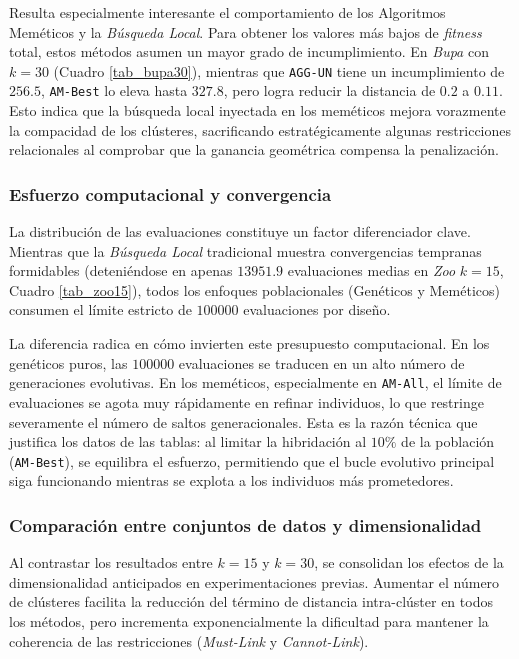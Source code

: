 \documentclass[a4paper,12pt]{article}%
\begin{document}
Resulta especialmente interesante el comportamiento de los Algoritmos Meméticos y la \textit{Búsqueda Local}. Para obtener los valores más bajos de \textit{fitness} total, estos métodos asumen un mayor grado de incumplimiento. En \textit{Bupa} con $k=30$ (Cuadro \ref{tab_bupa30}), mientras que \texttt{AGG-UN} tiene un incumplimiento de $256.5$, \texttt{AM-Best} lo eleva hasta $327.8$, pero logra reducir la distancia de $0.2$ a $0.11$. Esto indica que la búsqueda local inyectada en los meméticos mejora vorazmente la compacidad de los clústeres, sacrificando estratégicamente algunas restricciones relacionales al comprobar que la ganancia geométrica compensa la penalización.

\subsubsection{Esfuerzo computacional y convergencia}

\noindent La distribución de las evaluaciones constituye un factor diferenciador clave. Mientras que la \textit{Búsqueda Local} tradicional muestra convergencias tempranas formidables (deteniéndose en apenas $13951.9$ evaluaciones medias en \textit{Zoo} $k=15$, Cuadro \ref{tab_zoo15}), todos los enfoques poblacionales (Genéticos y Meméticos) consumen el límite estricto de $100000$ evaluaciones por diseño.

La diferencia radica en cómo invierten este presupuesto computacional. En los genéticos puros, las $100000$ evaluaciones se traducen en un alto número de generaciones evolutivas. En los meméticos, especialmente en \texttt{AM-All}, el límite de evaluaciones se agota muy rápidamente en refinar individuos, lo que restringe severamente el número de saltos generacionales. Esta es la razón técnica que justifica los datos de las tablas: al limitar la hibridación al $10\%$ de la población (\texttt{AM-Best}), se equilibra el esfuerzo, permitiendo que el bucle evolutivo principal siga funcionando mientras se explota a los individuos más prometedores.

\subsubsection{Comparación entre conjuntos de datos y dimensionalidad}

\noindent Al contrastar los resultados entre $k=15$ y $k=30$, se consolidan los efectos de la dimensionalidad anticipados en experimentaciones previas. Aumentar el número de clústeres facilita la reducción del término de distancia intra-clúster en todos los métodos, pero incrementa exponencialmente la dificultad para mantener la coherencia de las restricciones (\textit{Must-Link} y \textit{Cannot-Link}).
\end{document}
